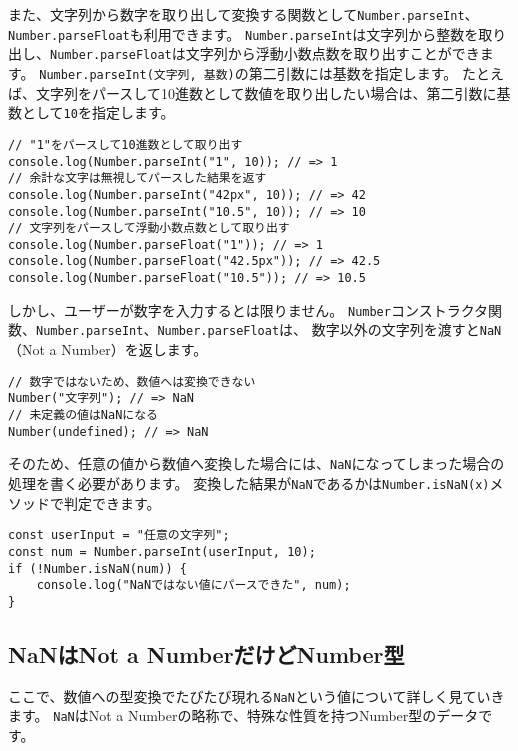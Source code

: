 また、文字列から数字を取り出して変換する関数として\texttt{Number.parseInt}、\texttt{Number.parseFloat}も利用できます。
\texttt{Number.parseInt}は文字列から整数を取り出し、\texttt{Number.parseFloat}は文字列から浮動小数点数を取り出すことができます。
\texttt{Number.parseInt(文字列, 基数)}の第二引数には基数を指定します。
たとえば、文字列をパースして10進数として数値を取り出したい場合は、第二引数に基数として\texttt{10}を指定します。

\begin{lstlisting}
// "1"をパースして10進数として取り出す
console.log(Number.parseInt("1", 10)); // => 1
// 余計な文字は無視してパースした結果を返す
console.log(Number.parseInt("42px", 10)); // => 42
console.log(Number.parseInt("10.5", 10)); // => 10
// 文字列をパースして浮動小数点数として取り出す
console.log(Number.parseFloat("1")); // => 1
console.log(Number.parseFloat("42.5px")); // => 42.5
console.log(Number.parseFloat("10.5")); // => 10.5
\end{lstlisting}

しかし、ユーザーが数字を入力するとは限りません。
\texttt{Number}コンストラクタ関数、\texttt{Number.parseInt}、\texttt{Number.parseFloat}は、
数字以外の文字列を渡すと\texttt{NaN}（Not a
Number）を返します。

\begin{lstlisting}
// 数字ではないため、数値へは変換できない
Number("文字列"); // => NaN
// 未定義の値はNaNになる
Number(undefined); // => NaN
\end{lstlisting}

そのため、任意の値から数値へ変換した場合には、\texttt{NaN}になってしまった場合の処理を書く必要があります。
変換した結果が\texttt{NaN}であるかは\texttt{Number.isNaN(x)}メソッドで判定できます。

\begin{lstlisting}
const userInput = "任意の文字列";
const num = Number.parseInt(userInput, 10);
if (!Number.isNaN(num)) {
    console.log("NaNではない値にパースできた", num);
}
\end{lstlisting}

\hypertarget{nan-is-number-type}{%
\subsection{NaNはNot a NumberだけどNumber型}\label{nan-is-number-type}}

ここで、数値への型変換でたびたび現れる\texttt{NaN}という値について詳しく見ていきます。
\texttt{NaN}はNot a
Numberの略称で、特殊な性質を持つNumber型のデータです。

